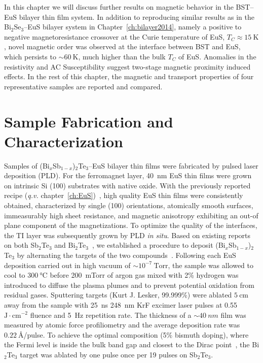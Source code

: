 In this chapter we will discuss further results on magnetic behavior in the BST--EuS bilayer thin film system. In addition to reproducing similar results as in the Bi$_2$Se$_3$--EuS bilayer system in Chapter~\ref{ch:bilayer2014}, namely a positive to negative magnetoresistance crossover at the Curie temperature of EuS, $T_C\approx15~\mathrm{K}$, novel magnetic order was observed at the interface between BST and EuS, which persists to $\sim 60~\mathrm{K}$, much higher than the bulk $T_C$ of EuS. Anomalies in the resistivity and AC Susceptibility suggest two-stage magnetic proximity induced effects. In the rest of this chapter, the magnetic and transport properties of four representative samples are reported and compared.

\FloatBarrier%
\section{Sample Fabrication and Characterization}
Samples of (Bi$_{x}$Sb$_{1-x}$)$_2$Te$_3$--EuS bilayer thin films were fabricated by pulsed laser deposition (PLD). For the ferromagnet layer, \SI{40}{nm} EuS thin films were grown on intrinsic Si (100) substrates with native oxide. With the previously reported recipe (\textit{q.v.} chapter~\ref{ch:EuS})~\cite{EuS_PLD}, high quality EuS thin films were consistently obtained, characterized by single (100) orientations, atomically smooth surfaces, immeasurably high sheet resistance, and magnetic anisotropy exhibiting an out-of plane component of the magnetizations. To optimize the quality of the interfaces, the TI layer was subsequently grown by PLD \textit{in situ}. Based on existing reports on both Sb$_2$Te$_3$ and Bi$_2$Te$_3$~\cite{telluride_PLD1, telluride_PLD2}, we established a procedure to deposit (Bi$_{x}$Sb$_{1-x}$)$_2$Te$_3$ by alternating the targets of the two compounds~\cite{PLD_alt_target2, PLD_alt_target}. Following each EuS deposition carried out in high vacuum of $\sim10^{-7}~\mathrm{Torr}$,  the sample was allowed to cool to $\SI{300}{\degreeCelsius}$ before 200~mTorr of argon gas mixed with 2\% hydrogen was introduced to diffuse the plasma plumes and to prevent potential oxidation from residual gases. Sputtering targets (Kurt J. Lesker, 99.999\%) were ablated $\SI{5}{\cm}$ away from the sample with 25~ns 248~nm KrF excimer laser pulses at 0.55 $\mathrm{J\cdot{}cm^{-2}}$ fluence and 5~Hz repetition rate. The thickness of a $\sim\SI{40}{nm}$ film was measured by atomic force profiliometry and the average deposition rate was $\SI{0.22}{\angstrom}$/pulse. To achieve the optimal composition (5$\%$ bismuth doping), where the Fermi level is inside the bulk band gap and closest to the Dirac point~\cite{ZhangJS2011}, the Bi$_2$Te$_3$ target was ablated by one pulse once per 19 pulses on Sb$_2$Te$_3$. 


